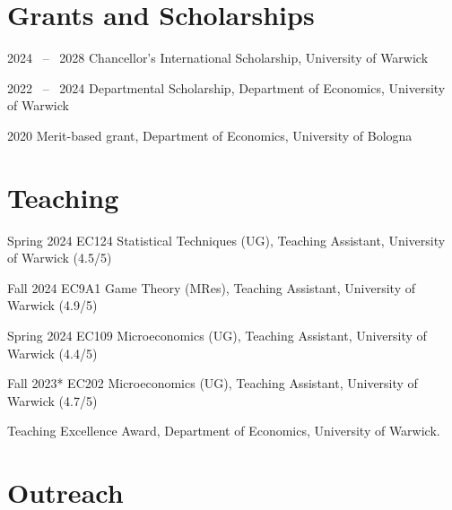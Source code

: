 \documentclass[11pt,a4paper]{article}
\begin{document}


\section{Grants and Scholarships}

\begin{cvenumerate}
    \item[2024 \ -- \ 2028] Chancellor's International Scholarship, University of Warwick
    \item[2022 \ -- \ 2024] Departmental Scholarship, Department of Economics, University of Warwick
    \item[2020] Merit-based grant, Department of Economics, University of Bologna
\end{cvenumerate}

\section{Teaching}

\begin{cvenumerate}
    \item[Spring 2024] EC124 Statistical Techniques (UG), Teaching Assistant, University of Warwick (4.5/5)
    \item[Fall 2024] EC9A1 Game Theory (MRes), Teaching Assistant, University of Warwick (4.9/5)
    \item[Spring 2024] EC109 Microeconomics (UG), Teaching Assistant, University of Warwick (4.4/5)
    \item[Fall 2023*] EC202 Microeconomics (UG), Teaching Assistant, University of Warwick (4.7/5)
\end{cvenumerate}
\vspace{-10pt}
{\small*Teaching Excellence Award, Department of Economics, University of Warwick.}

\section{Outreach}
\end{document}
